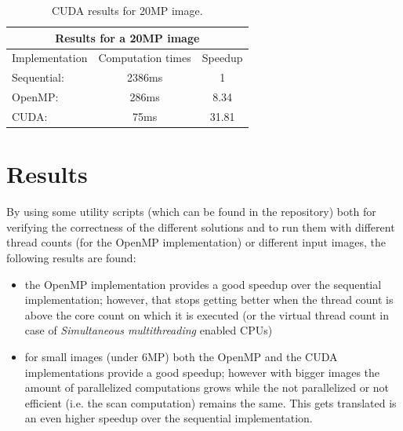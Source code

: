 \documentclass[10pt,twocolumn,letterpaper]{article}
\begin{document}
\begin{table}
    \begin{center}
    \begin{tabular}{|l|c|c|}
    \hline
    \multicolumn{3}{|c|}{Results for a 20MP image} \\
    \hline
    Implementation & Computation times & Speedup \\
    \hline
    Sequential: & 2386ms & 1 \\
    OpenMP: & 286ms & 8.34 \\
    CUDA: & 75ms & 31.81 \\
    \hline
    \end{tabular}
    \end{center}
    \caption{CUDA results for 20MP image.}
    \label{tbl:cuda-speedup-2}
\end{table}

\section{Results}

By using some utility scripts (which can be found in the repository) both for verifying
the correctness of the different solutions and to run them with different thread counts
(for the OpenMP implementation) or different input images, the following results are found:

\begin{itemize}
    \item the OpenMP implementation provides a good speedup over the sequential implementation;
          however, that stops getting better when the thread count is above the core count on
          which it is executed (or the virtual thread count in case of \emph{Simultaneous
          multithreading} enabled CPUs)
    \item for small images (under 6MP) both the OpenMP and the CUDA implementations provide a
          good speedup; however with bigger images the amount of parallelized computations grows
          while the not parallelized or not efficient (i.e. the scan computation) remains the same.
          This gets translated is an even higher speedup over the sequential implementation.
\end{itemize}

\newpage

\nocite{*}
 

\end{document}
